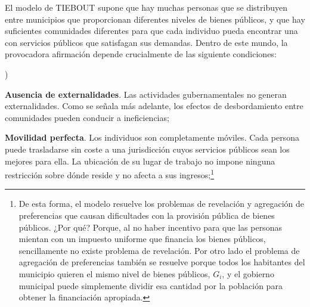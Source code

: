\documentclass[10pt,a4paper]{article}
\newcounter{alphaitem}
\newenvironment{la}
      {\begin{list}{\alph{alphaitem})}{%
          \usecounter{alphaitem}%
          \setlength{\leftmargin}{1cm}%
          \setlength{\parskip}{3pt}%
          \setlength{\itemsep}{0pt}%
          \setlength{\parsep}{0pt}%
      }}
      {\end{list}}
\begin{document}
El modelo de TIEBOUT supone que hay muchas personas que se distribuyen entre municipios que proporcionan diferentes niveles de bienes públicos, y que hay suficientes comunidades diferentes para que cada individuo pueda encontrar una con servicios públicos que satisfagan sus demandas. Dentro de este mundo, la provocadora afirmación depende crucialmente de las siguiente condiciones:
\begin{la}
    \item \textbf{Ausencia de externalidades}. Las actividades gubernamentales no generan externalidades. Como se señala más adelante, los efectos de desbordamiento entre comunidades pueden conducir a ineficiencias;
    \item \textbf{Movilidad perfecta}. Los individuos son completamente móviles. Cada persona puede trasladarse sin coste a una jurisdicción cuyos servicios públicos sean los mejores para ella. La ubicación de su lugar de trabajo no impone ninguna restricción sobre dónde reside y no afecta a sus ingresos;\footnote{%
        De esta forma, el modelo resuelve los problemas de revelación y agregación de preferencias que causan dificultades con la provisión pública de bienes públicos. ¿Por qué? Porque, al no haber incentivo para que las personas mientan con un impuesto uniforme que financia los bienes públicos, sencillamente no existe problema de revelación. Por otro lado el problema de agregación de preferencias también se resuelve porque todos los habitantes del municipio quieren el mismo nivel de bienes públicos, $G_i$, y el gobierno municipal puede simplemente dividir esa cantidad por la población para obtener la financiación apropiada.
    
}
\end{la}
\end{document}
